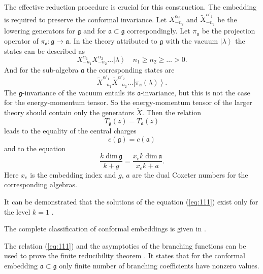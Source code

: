 \documentclass[12pt]{iopart}
\theoremstyle{definition}
\theoremstyle{definition}
\theoremstyle{definition}
\theoremstyle{definition}
\begin{document}
The effective reduction procedure is crucial for this construction.
The embedding is required to preserve the conformal invariance.
Let $X^{\alpha_j}_{-n_j}$ and $\tilde{X}^{\alpha'_j}_{-n_j}$ be the lowering generators for
$\mathfrak{g}$ and for $\mathfrak{a}\subset\mathfrak{g}$ correspondingly.
Let $\pi_{\mathfrak{a}}$ be the projection operator of
$\pi_{\mathfrak{a}}:\mathfrak{g}\longrightarrow \mathfrak{a}$.
In the theory attributed to $\mathfrak{g}$ with the vacuum $\left|\lambda\right>$
the states can be described as
\begin{equation*}
  \label{eq:109}
  X^{\alpha_1}_{-n_1}X^{\alpha_2}_{-n_2}\dots\left|\lambda\right>\quad n_1\geq n_2\geq \dots>0.
\end{equation*}
And for the sub-algebra $\mathfrak{a}$ the corresponding states are
\begin{equation*}
  \label{eq:110}
  \tilde{X}^{\alpha'_1}_{-n_1}\tilde{X}^{\alpha'_2}_{-n_2}\dots\left|\pi_{\mathfrak{a}}(\lambda)\right>.
\end{equation*}
The $\mathfrak{g}$-invariance of the vacuum entails its $\mathfrak{a}$-invariance,
but this is not the case for the energy-momentum tensor. So the energy-momentum tensor of the larger theory
should contain only the generators $\tilde{X}$. Then the relation
\begin{equation}
  \label{eq:2}
  T_{\mathfrak{g}}(z)=T_{\mathfrak{a}}(z)
\end{equation}
leads to the equality of the central charges
\begin{equation*}
  \label{eq:33}
  c(\mathfrak{g})=c(\mathfrak{a})
\end{equation*}
and to the equation
\begin{equation}
  \label{eq:111}
  \frac{k\;\mathrm{dim}\,\mathfrak{g}}{k+g}=\frac{x_e k\; \mathrm{dim}\,\mathfrak{a}}{x_ek+a}.
\end{equation}
Here $x_e$ is the embedding index and $g$, $a$ are the dual Coxeter numbers for the  corresponding algebras.

It can be demonstrated that the solutions of the equation (\ref{eq:111}) exist only
for the level $k=1$ \cite{difrancesco1997cft}.

The complete classification of conformal embeddings is given in \cite{schellekens1986conformal}.

The relation (\ref{eq:111}) and the asymptotics of the branching functions can be used
to prove the finite reducibility theorem \cite{kac1988modular}.
It states that for the conformal embedding  $\mathfrak{a}\subset\mathfrak{g}$
only finite number of branching coefficients have nonzero values.
\end{document}
